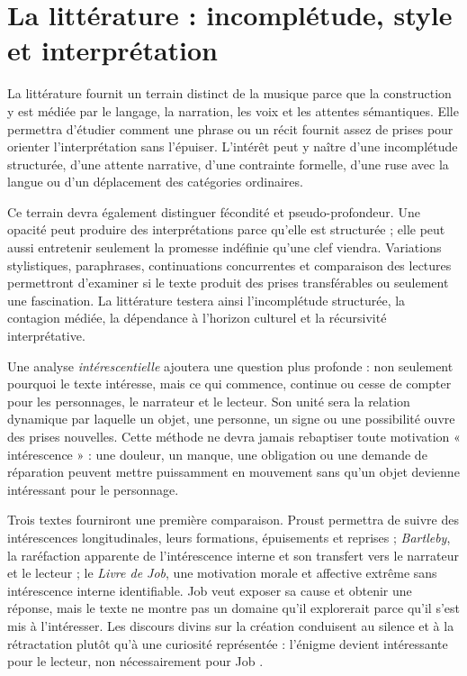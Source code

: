 \documentclass[11pt,a4paper]{article}
\begin{document}
\section{La littérature : incomplétude, style et interprétation}

La littérature fournit un terrain distinct de la musique parce que la
construction y est médiée par le langage, la narration, les voix et les attentes
sémantiques. Elle permettra d'étudier comment une phrase ou un récit fournit
assez de prises pour orienter l'interprétation sans l'épuiser. L'intérêt peut y
naître d'une incomplétude structurée, d'une attente narrative, d'une contrainte
formelle, d'une ruse avec la langue ou d'un déplacement des catégories
ordinaires.

Ce terrain devra également distinguer fécondité et pseudo-profondeur. Une
opacité peut produire des interprétations parce qu'elle est structurée ; elle
peut aussi entretenir seulement la promesse indéfinie qu'une clef viendra.
Variations stylistiques, paraphrases, continuations concurrentes et comparaison
des lectures permettront d'examiner si le texte produit des prises
transférables ou seulement une fascination. La littérature testera ainsi
l'incomplétude structurée, la contagion médiée, la dépendance à l'horizon
culturel et la récursivité interprétative.

Une analyse \emph{intérescentielle} ajoutera une question plus profonde : non
seulement pourquoi le texte intéresse, mais ce qui commence, continue ou cesse
de compter pour les personnages, le narrateur et le lecteur. Son unité sera la
relation dynamique par laquelle un objet, une personne, un signe ou une
possibilité ouvre des prises nouvelles. Cette méthode ne devra jamais rebaptiser
toute motivation « intérescence » : une douleur, un manque, une obligation ou
une demande de réparation peuvent mettre puissamment en mouvement sans qu'un
objet devienne intéressant pour le personnage.

Trois textes fourniront une première comparaison. Proust permettra de suivre
des intérescences longitudinales, leurs formations, épuisements et reprises ;
\emph{Bartleby}, la raréfaction apparente de l'intérescence interne et son
transfert vers le narrateur et le lecteur ; le \emph{Livre de Job}, une
motivation morale et affective extrême sans intérescence interne identifiable.
Job veut exposer sa cause et obtenir une réponse, mais le texte ne montre pas un
domaine qu'il explorerait parce qu'il s'est mis à l'intéresser. Les discours
divins sur la création conduisent au silence et à la rétractation plutôt qu'à
une curiosité représentée : l'énigme devient intéressante pour le lecteur, non
nécessairement pour Job \parencite{jps1985tanakh}.
\end{document}
